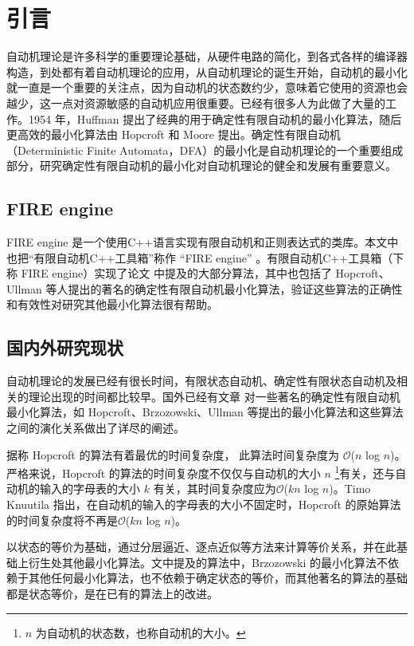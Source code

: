 \chapter{引言}
自动机理论是许多科学的重要理论基础，从硬件电路的简化，到各式各样的编译器构造，到处都有着自动机理论的应用，从自动机理论的诞生开始，自动机的最小化就一直是一个重要的关注点，因为自动机的状态数约少，意味着它使用的资源也会越少，这一点对资源敏感的自动机应用很重要。已经有很多人为此做了大量的工作。1954 年，Huffman 提出了经典的用于确定性有限自动机的最小化算法\cite{HUFFMAN1954161}，随后更高效的最小化算法由 Hopcroft 和 Moore 提出。确定性有限自动机（Deterministic Finite Automata，DFA）的最小化是自动机理论的一个重要组成部分，研究确定性有限自动机的最小化对自动机理论的健全和发展有重要意义。

\section{FIRE engine}
FIRE engine \cite{watson1994design}是一个使用C++语言实现有限自动机和正则表达式的类库。本文中也把“有限自动机C++工具箱”称作 “FIRE engine” 。有限自动机C++工具箱（下称 FIRE engine）实现了论文 \cite{watson1993taxonomya,watson1993taxonomyb} 中提及的大部分算法，其中也包括了 Hopcroft、Ullman 等人提出的著名的确定性有限自动机最小化算法，验证这些算法的正确性和有效性对研究其他最小化算法很有帮助。

\section{国内外研究现状}

自动机理论的发展已经有很长时间，有限状态自动机、确定性有限状态自动机及相关的理论出现的时间都比较早。国外已经有文章 \cite{watson1993taxonomyb} 对一些著名的确定性有限自动机最小化算法，如 Hopcroft、Brzozowski、Ullman 等提出的最小化算法和这些算法之间的演化关系做出了详尽的阐述。

据称 Hopcroft 的算法有着最优的时间复杂度， 此算法时间复杂度为 $\mathcal{O}$($n$ log $n$)\cite{Hopc71}。严格来说，Hopcroft 的算法的时间复杂度不仅仅与自动机的大小 $n$ \footnote{ $n$ 为自动机的状态数，也称自动机的大小。}有关，还与自动机的输入的字母表的大小 $k$ 有关，其时间复杂度应为$\mathcal{O}$($kn$ log $n$)。Timo Knuutila 指出，在自动机的输入的字母表的大小不固定时，Hopcroft 的原始算法的时间复杂度将不再是$\mathcal{O}$($kn$ log $n$)\cite{KNUUTILA2001333}。

以状态的等价为基础，通过分层逼近、逐点近似等方法来计算等价关系，并在此基础上衍生处其他最小化算法。文中提及的算法中，Brzozowski 的最小化算法不依赖于其他任何最小化算法，也不依赖于确定状态的等价，而其他著名的算法的基础都是状态等价，是在已有的算法上的改进\cite{watson1993taxonomyb}。

